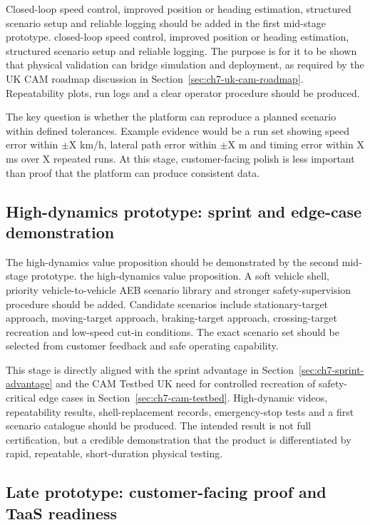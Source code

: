 Closed-loop speed control, improved position or heading estimation, structured scenario setup and reliable logging should be added in the first mid-stage prototype. closed-loop speed control, improved position or heading estimation, structured scenario setup and reliable logging. The purpose is for it to be shown that physical validation can bridge simulation and deployment, as required by the UK CAM roadmap discussion in Section~\ref{sec:ch7-uk-cam-roadmap}. Repeatability plots, run logs and a clear operator procedure should be produced.

The key question is whether the platform can reproduce a planned scenario within defined tolerances. Example evidence would be a run set showing speed error within $\pm$X km/h, lateral path error within $\pm$X m and timing error within X ms over X repeated runs. At this stage, customer-facing polish is less important than proof that the platform can produce consistent data.

\subsection{High-dynamics prototype: sprint and edge-case demonstration}
\label{sec:ch8_high_dynamics_prototype}

The high-dynamics value proposition should be demonstrated by the second mid-stage prototype. the high-dynamics value proposition. A soft vehicle shell, priority vehicle-to-vehicle AEB scenario library and stronger safety-supervision procedure should be added. Candidate scenarios include stationary-target approach, moving-target approach, braking-target approach, crossing-target recreation and low-speed cut-in conditions. The exact scenario set should be selected from customer feedback and safe operating capability.

This stage is directly aligned with the sprint advantage in Section~\ref{sec:ch7-sprint-advantage} and the CAM Testbed UK need for controlled recreation of safety-critical edge cases in Section~\ref{sec:ch7-cam-testbed}. High-dynamic videos, repeatability results, shell-replacement records, emergency-stop tests and a first scenario catalogue should be produced. The intended result is not full certification, but a credible demonstration that the product is differentiated by rapid, repeatable, short-duration physical testing.

\subsection{Late prototype: customer-facing proof and TaaS readiness}
\label{sec:ch8_late_prototype}

